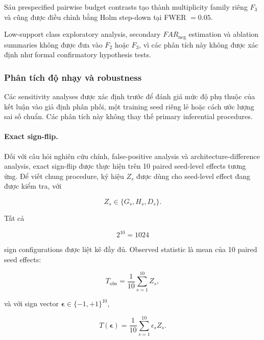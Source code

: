 \documentclass[pdflatex,sn-mathphys-num]{sn-jnl}%
\theoremstyle{thmstyleone}%
\theoremstyle{thmstyletwo}%
\theoremstyle{thmstylethree}%
\begin{document}
Sáu prespecified pairwise budget contrasts tạo thành multiplicity family
riêng \(F_3\) và cũng được điều chỉnh bằng Holm step-down tại
FWER \(=0.05\).

Low-support class exploratory analysis, secondary \(FAR_{\mathrm{neg}}\)
estimation và ablation summaries không được đưa vào \(F_2\) hoặc \(F_3\),
vì các phân tích này không được xác định như formal confirmatory hypothesis
tests.

\subsubsection{Phân tích độ nhạy và robustness}
\label{subsubsec:sensitivity_robustness}

Các sensitivity analyses được xác định trước để đánh giá mức độ phụ thuộc
của kết luận vào giả định phân phối, một training seed riêng lẻ hoặc cách
ước lượng sai số chuẩn. Các phân tích này không thay thế primary inferential
procedures.

\paragraph{Exact sign-flip.}

Đối với câu hỏi nghiên cứu chính, false-positive analysis và
architecture-difference analysis, exact sign-flip được thực hiện trên
10 paired seed-level effects tương ứng. Để viết chung procedure, ký hiệu
\(Z_s\) được dùng cho seed-level effect đang được kiểm tra, với

\begin{equation}
Z_s
\in
\{G_s,H_s,D_s\}.
\end{equation}

Tất cả

\begin{equation}
2^{10}=1024
\end{equation}

sign configurations được liệt kê đầy đủ. Observed statistic là mean của
10 paired seed effects:

\begin{equation}
T_{\mathrm{obs}}
=
\frac{1}{10}
\sum_{s=1}^{10}Z_s,
\end{equation}

và với sign vector
\(\boldsymbol{\epsilon}\in\{-1,+1\}^{10}\),

\begin{equation}
T(\boldsymbol{\epsilon})
=
\frac{1}{10}
\sum_{s=1}^{10}
\epsilon_s Z_s.
\end{equation}
\end{document}
